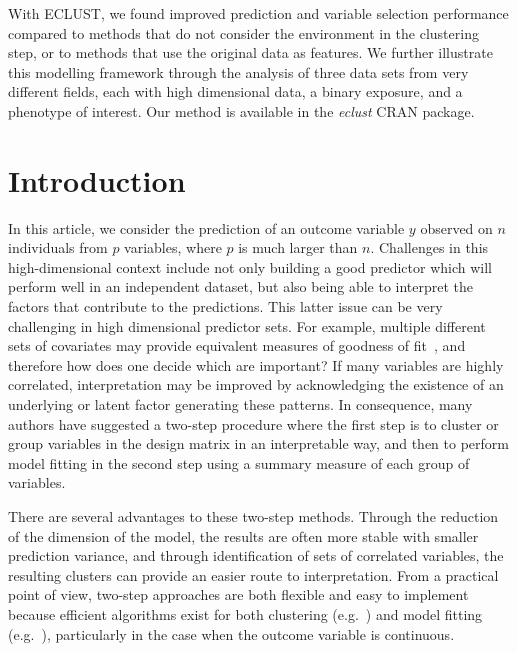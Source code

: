 With ECLUST, we found improved prediction and variable selection performance compared to methods that do not consider the environment in the clustering step, or to methods that use the original data as features.  We further illustrate this modelling framework through the analysis of three data sets from very different fields, each with high dimensional data, a binary exposure, and a phenotype of interest. Our method is available in the \emph{eclust} CRAN package.

\newpage

\section{Introduction}
In this article, we consider the prediction of an outcome variable $y$ observed on $n$ individuals from $p$ variables, where $p$ is much larger than $n$. Challenges in this high-dimensional context include not only building a good predictor which will perform well in an independent dataset, but also being able to interpret the factors that contribute to the predictions. This latter issue can be very challenging in high dimensional predictor sets. For example, multiple different sets of covariates may provide equivalent measures of goodness of fit~\citep{fan2014challenges}, and therefore how does one decide which are important? If many variables are highly correlated, interpretation may be improved by acknowledging the existence of an underlying or latent factor generating these patterns. In consequence, many authors have suggested a two-step procedure where the first step is to cluster or group variables in the design matrix in an interpretable way, and then to perform  model fitting in the second step using a summary measure of each group of variables.

There are several advantages to these two-step methods.  Through the reduction of the dimension of the model, the results are often more stable with smaller prediction variance, and through identification of sets of correlated variables, the resulting clusters can provide an easier route to interpretation. From a practical point of view, two-step approaches are both flexible and easy to implement because efficient algorithms exist for both clustering (e.g.~\citep{fastclust}) and model fitting (e.g.~\citep{friedman2010regularization,gglasso,kuhn2008caret}), particularly in the case when the outcome variable is continuous. 

